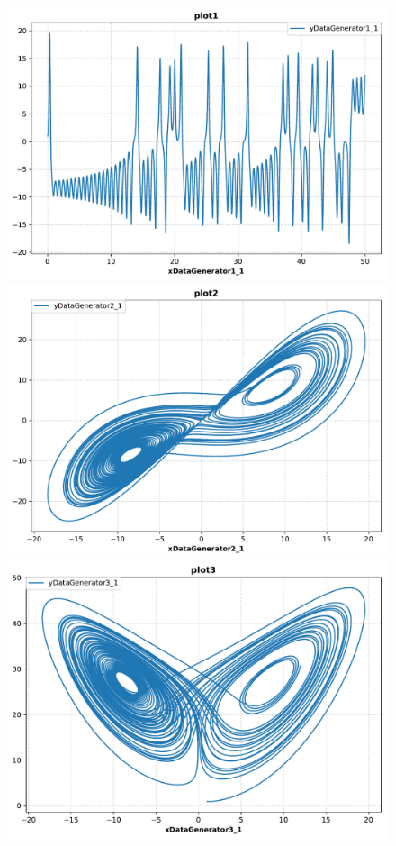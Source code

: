 \begin{figure}[ht]
    \centering
    \begin{minipage}{0.47\textwidth}
        \centering
        \includegraphics[width=1.0\textwidth]{examples/lorenz-sbml/results/sedml_webtools/plot1}
        \includegraphics[width=1.0\textwidth]{examples/lorenz-sbml/results/sedml_webtools/plot2}
		\includegraphics[width=1.0\textwidth]{examples/lorenz-sbml/results/sedml_webtools/plot3}

\end{minipage}
\end{figure}
